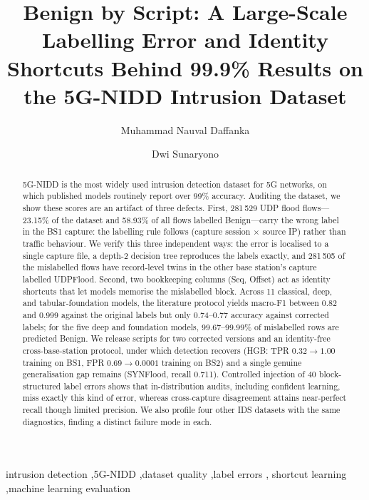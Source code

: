 \documentclass[preprint,12pt]{elsarticle}
\begin{document}
\begin{frontmatter}

\title{Benign by Script: A Large-Scale Labelling Error and Identity Shortcuts
Behind 99.9\% Results on the 5G-NIDD Intrusion Dataset}

\author[its]{Muhammad Nauval Daffanka}
\author[its]{Dwi Sunaryono}

\begin{abstract}
5G-NIDD is the most widely used intrusion detection dataset for 5G networks,
on which published models routinely report over 99\% accuracy. Auditing the
dataset, we show these scores are an artifact of three defects. First,
281\,529 UDP flood flows---23.15\% of the dataset and 58.93\% of all flows
labelled Benign---carry the wrong label in the BS1 capture: the labelling rule
follows (capture session $\times$ source IP) rather than traffic behaviour. We
verify this three independent ways: the error is localised to a single
capture file, a depth-2 decision tree reproduces the labels exactly,
and 281\,505 of the mislabelled flows have record-level twins in
the other base station's capture labelled UDPFlood. Second, two bookkeeping
columns (Seq, Offset) act as identity shortcuts that let models memorise the
mislabelled block. Across 11 classical, deep, and tabular-foundation models,
the literature protocol yields macro-F1 between 0.82 and
0.999 against the original labels but only 0.74--0.77 accuracy against corrected
labels; for the five deep and foundation models, 99.67--99.99\% of mislabelled
rows are predicted Benign. We release
scripts for two corrected versions and an identity-free cross-base-station
protocol, under which detection recovers (HGB: TPR $0.32 \to 1.00$ training on
BS1, FPR $0.69 \to 0.0001$ training on BS2) and a single genuine generalisation gap remains (SYNFlood,
recall 0.711). Controlled injection of 40 block-structured label errors
shows that in-distribution audits, including confident learning, miss
exactly this kind of error, whereas cross-capture disagreement attains
near-perfect recall though limited precision. We also profile four other IDS datasets with the
same diagnostics, finding a distinct failure mode in each.
\end{abstract}

\begin{keyword}
intrusion detection \sep 5G-NIDD \sep dataset quality \sep label errors \sep
shortcut learning \sep machine learning evaluation
\end{keyword}

\end{frontmatter}
\end{document}
